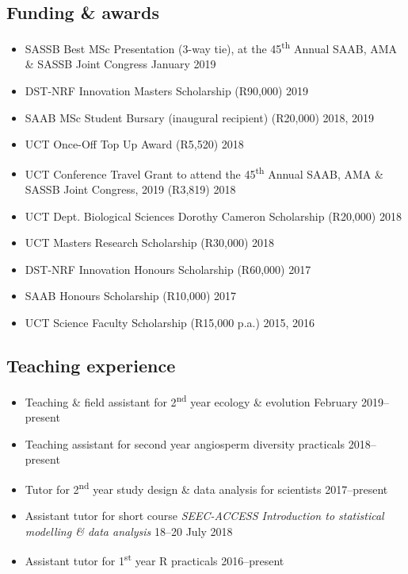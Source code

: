 \documentclass[10pt]{article}
\begin{document}
\subsection*{Funding \& awards}
\begin{itemize}[noitemsep, nolistsep]
\item SASSB Best MSc Presentation (3-way tie), at the 45\textsuperscript{th}
  Annual SAAB, AMA \& SASSB Joint Congress \hfill January 2019
\item DST-NRF Innovation Masters Scholarship (R90,000) \hfill 2019
\item SAAB MSc Student Bursary (inaugural recipient) (R20,000) \hfill 2018, 2019
\item UCT Once-Off Top Up Award (R5,520) \hfill 2018
\item UCT Conference Travel Grant to attend the 45\textsuperscript{th} Annual 
  SAAB, AMA \& SASSB Joint Congress, 2019 (R3,819) \hfill 2018
\item UCT Dept. Biological Sciences Dorothy Cameron Scholarship (R20,000)
  \hfill 2018
\item UCT Masters Research Scholarship (R30,000) \hfill 2018
\item DST-NRF Innovation Honours Scholarship (R60,000) \hfill 2017
\item SAAB Honours Scholarship (R10,000) \hfill 2017
\item UCT Science Faculty Scholarship (R15,000 p.a.) \hfill 2015, 2016
\end{itemize}

\subsection*{Teaching experience}
\begin{itemize}[noitemsep, nolistsep]
\item Teaching \& field assistant for 2\textsuperscript{nd} year ecology \&
  evolution \hfill February 2019--present
\item Teaching assistant for second year angiosperm diversity practicals
  \hfill 2018--present
\item Tutor for 2\textsuperscript{nd} year study design \& data analysis for
  scientists \hfill 2017--present
\item Assistant tutor for short course \textit{SEEC-ACCESS Introduction to
  statistical modelling \& data analysis} \hfill 18--20 July 2018
\item Assistant tutor for 1\textsuperscript{st} year R practicals
  \hfill 2016--present
\end{itemize}
\end{document}
